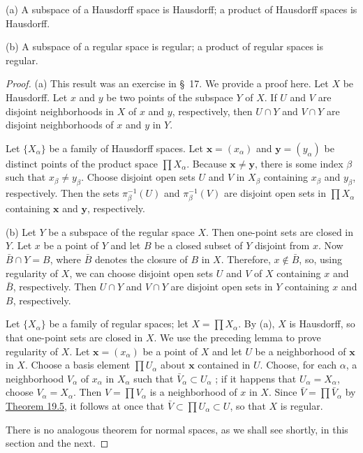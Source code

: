 \begin{theorem}
\label{thm:\thetheorem}
 (a) A subspace of a Hausdorff space is Hausdorff; a product of Hausdorff spaces is Hausdorff.

(b) A subspace of a regular space is regular; a product of regular spaces is regular.
\end{theorem}
\begin{proof}
 (a) This result was an exercise in \S\ 17. We provide a proof here. Let \(X\) be Hausdorff. Let \(x\) and \(y\) be two points of the subspace \(Y\) of \(X\). If \(U\) and \(V\) are disjoint neighborhoods in \(X\) of \(x\) and \(y\), respectively, then \(U \cap Y\) and \(V \cap Y\) are disjoint neighborhoods of \(x\) and \(y\) in \(Y\).

Let \(\{ X_{\alpha }\}\) be a family of Hausdorff spaces. Let \(\mathbf{x} = ( x_{\alpha })\) and \(\mathbf{y} = ( y_{\alpha })\) be distinct points of the product space \(\prod {X}_{\alpha }\). Because \(\mathbf{x} \neq \mathbf{y}\), there is some index \(\beta\) such that \(x_{\beta } \neq {y}_{\beta }\). Choose disjoint open sets \(U\) and \(V\) in \(X_{\beta }\) containing \(x_{\beta }\) and \(y_{\beta }\), respectively. Then the sets \({\pi }_{\beta }^{-1}( U)\) and \({\pi }_{\beta }^{-1}( V)\) are disjoint open sets in \(\prod {X}_{\alpha }\) containing \(\mathbf{x}\) and \(\mathbf{y}\), respectively.

(b) Let \(Y\) be a subspace of the regular space \(X\). Then one-point sets are closed in \(Y\). Let \(x\) be a point of \(Y\) and let \(B\) be a closed subset of \(Y\) disjoint from \(x\). Now \(\bar{B} \cap Y = B\), where \(\bar{B}\) denotes the closure of \(B\) in \(X\). Therefore, \(x \notin \bar{B}\), so, using regularity of \(X\), we can choose disjoint open sets \(U\) and \(V\) of \(X\) containing \(x\) and \(\bar{B}\), respectively. Then \(U \cap Y\) and \(V \cap Y\) are disjoint open sets in \(Y\) containing \(x\) and \(B\), respectively.

Let \(\{ X_{\alpha }\}\) be a family of regular spaces; let \(X = \prod {X}_{\alpha }\). By (a), \(X\) is Hausdorff, so that one-point sets are closed in \(X\). We use the preceding lemma to prove regularity of \(X\). Let \(\mathbf{x} = ( x_{\alpha })\) be a point of \(X\) and let \(U\) be a neighborhood of \(\mathbf{x}\) in \(X\). Choose a basis element \(\prod {U}_{\alpha }\) about \(\mathbf{x}\) contained in \(U\). Choose, for each \(\alpha\), a neighborhood \(V_{\alpha }\) of \(x_{\alpha }\) in \(X_{\alpha }\) such that \(\bar{V}_{\alpha } \subset {U}_{\alpha }\) ; if it happens that \(U_{\alpha } = X_{\alpha }\), choose \(V_{\alpha } = X_{\alpha }\). Then \(V = \prod {V}_{\alpha }\) is a neighborhood of \(x\) in \(X\). Since \(\bar{V} = \prod {\bar{V}}_{\alpha }\) by \hyperref[thm:19.5]{Theorem 19.5}, it follows at once that \(\bar{V} \subset \prod {U}_{\alpha } \subset U\), so that \(X\) is regular.

There is no analogous theorem for normal spaces, as we shall see shortly, in this section and the next.
\end{proof}

